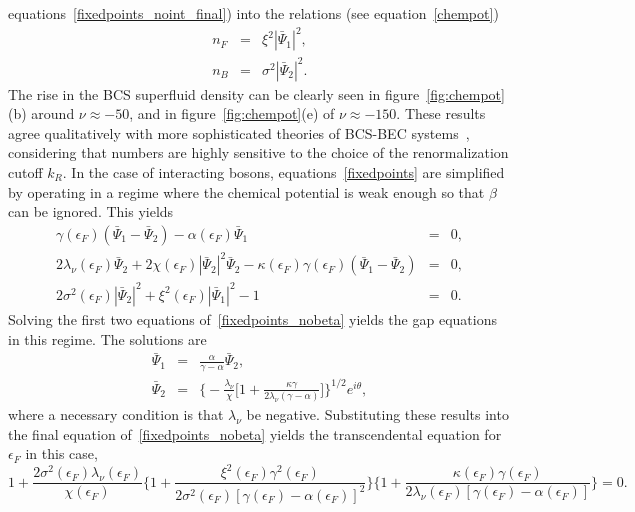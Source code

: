 \documentclass[a4paper,10pt]{article}
\begin{document}
equations~\ref{fixedpoints_noint_final}) into the relations (see equation~\ref{chempot})
\begin{eqnarray}
n_F &=& \xi^2 | \bar{\Psi}_1|^2, \nonumber \\
n_B &=& \sigma^2| \bar{\Psi}_2|^2.
\end{eqnarray}
The rise in the BCS superfluid density can be clearly seen in figure~\ref{fig:chempot}(b) around $\nu \approx -50$, and in figure~\ref{fig:chempot}(e) of $\nu \approx -150$. These results agree qualitatively with more sophisticated theories of BCS-BEC systems~\cite{leggett:book}, considering that numbers are highly sensitive to the choice of the renormalization cutoff $k_R$.
In the case of interacting bosons, equations~\ref{fixedpoints} are simplified by operating in a regime where the chemical potential is weak enough so that $\beta$ can be ignored. This yields
\begin{eqnarray}
\label{fixedpoints_nobeta}
\gamma\left(\epsilon_F\right) \left(  \bar{\Psi}_1- \bar{\Psi}_2 \right) - \alpha\left(\epsilon_F\right)  \bar{\Psi}_1 &=& 0, \nonumber \\
2\lambda_\nu\left(\epsilon_F\right)  \bar{\Psi}_2 +2 \chi\left(\epsilon_F\right)| \bar{\Psi}_2|^2 \bar{\Psi}_2 - \kappa\left(\epsilon_F\right)\gamma\left(\epsilon_F\right) \left( \bar{\Psi}_1- \bar{\Psi}_2 \right) &=& 0, \nonumber \\
2 \sigma^2(\epsilon_F) | \bar{\Psi}_2|^2 + \xi^2(\epsilon_F) | \bar{\Psi}_1|^2 -1 &=& 0.
\end{eqnarray}
Solving the first two equations of~\ref{fixedpoints_nobeta} yields the gap equations in this regime. The solutions are
\begin{eqnarray}
\label{fixedpoints_nobeta_final}
\bar{\Psi}_1 &=& \frac{\alpha}{\gamma-\alpha} \bar{\Psi}_2, \nonumber \\
\bar{\Psi}_2 &=& \bigg \{-\frac{\lambda_\nu}{\chi} \bigg[1+\frac{\kappa\gamma}{2\lambda_\nu\left(\gamma-\alpha \right)} \bigg]  \bigg \}^{1/2} e^{i\theta},
\end{eqnarray}
where a necessary condition is that $\lambda_\nu$ be negative. Substituting these results into the final equation of~\ref{fixedpoints_nobeta} yields the transcendental equation for $\epsilon_F$ in this case,
\begin{equation}
\label{chempot_final_nobeta}
1+\frac{2\sigma^2\left(\epsilon_F\right)\lambda_\nu\left(\epsilon_F\right)}{\chi\left(\epsilon_F\right)} \bigg\{1+\frac{\xi^2\left(\epsilon_F\right)\gamma^2\left(\epsilon_F\right)}{2\sigma^2\left(\epsilon_F\right)\left[\gamma\left(\epsilon_F\right)-\alpha\left(\epsilon_F\right) \right]^2} \bigg\} \bigg\{1+\frac{\kappa\left(\epsilon_F\right)\gamma\left(\epsilon_F\right)}{2\lambda_\nu\left(\epsilon_F\right)\left[\gamma\left(\epsilon_F\right)-\alpha\left(\epsilon_F\right) \right]} \bigg\} = 0.
\end{equation}
\end{document}
